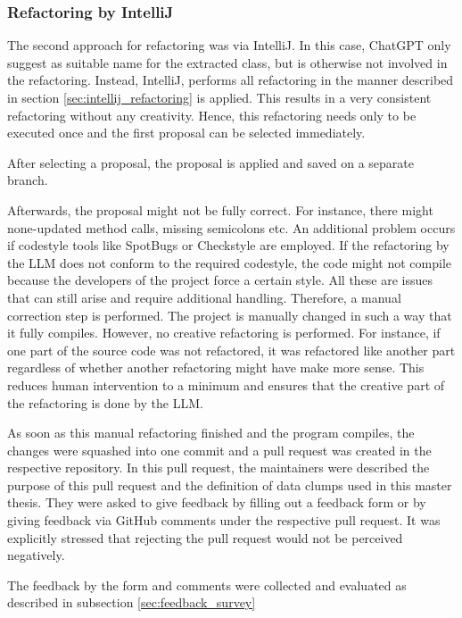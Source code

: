 \subsubsection{Refactoring by IntelliJ}

The second approach for refactoring was via IntelliJ. In this case, ChatGPT only suggest as suitable name for the extracted class, but is otherwise not involved in the refactoring. Instead, IntelliJ, performs all refactoring in the manner described in section  \ref{sec:intellij_refactoring} is applied. This results in a very consistent refactoring without any creativity. Hence, this refactoring needs only to be executed once and the first proposal can be selected immediately. 

After selecting a proposal, the proposal is applied and saved on a separate branch.

Afterwards, the proposal might not be fully correct. For instance, there might none-updated method calls, missing semicolons etc. An additional problem occurs if codestyle tools like SpotBugs or Checkstyle are employed. If the refactoring by the \ac{LLM} does not conform to the required codestyle, the code might not compile because the developers of the project force a certain style. All these are issues that can still arise and require additional handling. Therefore, a manual correction step is performed. The project is  manually changed in such a way that it fully compiles. However, no creative refactoring is performed. For instance, if one part of the source code was not refactored, it was refactored like another part regardless of whether another refactoring might have make more sense. This reduces human intervention to a minimum and ensures that the creative part of the refactoring is done by the \ac{LLM}. 

As soon as this manual refactoring finished and the program compiles, the changes were squashed into one commit and a pull request was created in the respective repository. In this pull request, the maintainers were described the purpose of this pull request and  the definition of data clumps used in this master thesis. They were asked to give feedback by filling out a feedback form or by giving feedback via GitHub comments under the respective pull request. It was explicitly stressed that rejecting the pull request would not be perceived negatively. 

The feedback by the form and comments were collected and evaluated as described in subsection \ref{sec:feedback_survey}


